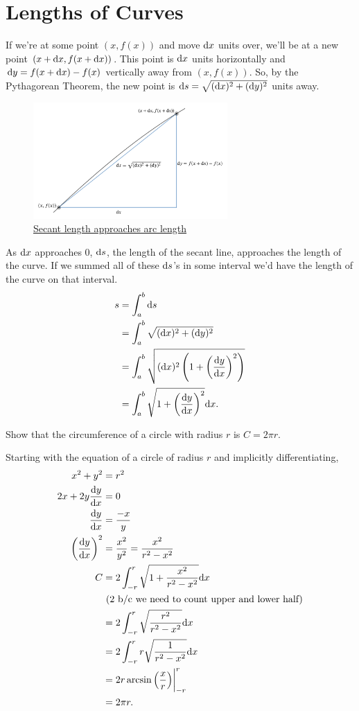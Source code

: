 \section{Lengths of Curves}
If we're at some point $(x,f(x))$ and move $\mathrm{d} x$ units over, we'll be at a new point $(x+\mathrm{d} x,f(x+\mathrm{d} x))$.
This point is $\mathrm{d} x$ units horizontally and $\mathrm{d} y=f(x+\mathrm{d} x)-f(x)$ vertically away from $(x,f(x))$.
So, by the Pythagorean Theorem, the new point is $\mathrm{d} s = \sqrt{(\mathrm{d} x)^2+(\mathrm{d} y)^2}$ units away.

\begin{figure}[H]
	\label{arclength}
	\centering
	\includegraphics[width=0.66\textwidth]{./applications_integrals/arclength.png}
	\caption{\hyperref{}{}{}{Secant length approaches arc length}}
\end{figure}
\noindent
As $\mathrm{d} x$ approaches 0, $\mathrm{d} s$, the length of the secant line, approaches the length of the curve.
If we summed all of these $\mathrm{d} s$'s in some interval we'd have the length of the curve on that interval.
\begin{align*}
	s &= \int_{a}^{b}{\mathrm{d} s} \\
	&= \int_{a}^{b}{\sqrt{(\mathrm{d} x)^2+(\mathrm{d} y)^2}} \\
	&= \int_{a}^{b}{\sqrt{(\mathrm{d} x)^2\left(1+\left(\frac{\mathrm{d} y}{\mathrm{d} x}\right)^2\right)}} \\
	&= \int_{a}^{b}{\sqrt{1+\left(\frac{\mathrm{d} y}{\mathrm{d} x}\right)^2}\mathrm{d} x}.
\end{align*}

\begin{example}
	Show that the circumference of a circle with radius $r$ is $C=2\pi r$.
\end{example}
Starting with the equation of a circle of radius $r$ and implicitly differentiating,
\begin{align*}
	x^2 + y^2 &= r^2 \\
	2x + 2y\frac{\mathrm{d} y}{\mathrm{d} x} &= 0 \\
	\frac{\mathrm{d} y}{\mathrm{d} x} &= \frac{-x}{y} \\
	\left(\frac{\mathrm{d} y}{\mathrm{d} x}\right)^2 &= \frac{x^2}{y^2} = \frac{x^2}{r^2-x^2} \\
	C &= 2\int_{-r}^{r}{\sqrt{1+\frac{x^2}{r^2-x^2}}\mathrm{d} x} \\ 
	&\text{ (2 b/c we need to count upper and lower half)} \\
	&= 2\int_{-r}^{r}{\sqrt{\frac{r^2}{r^2-x^2}}\mathrm{d} x} \\
	&= 2\int_{-r}^{r}{r\sqrt{\frac{1}{r^2-x^2}}\mathrm{d} x} \\
	&= 2r\arcsin{\left(\frac{x}{r}\right)}\biggr\rvert_{-r}^{r} \\
	&= 2\pi r.
\end{align*}

